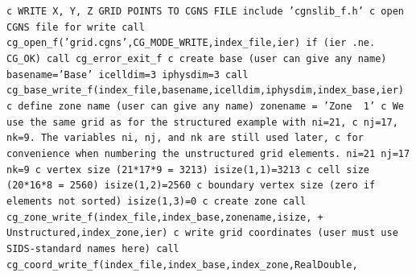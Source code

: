 \documentclass[12pt]{article}
\begin{document}
{\tt \noindent c  WRITE X, Y, Z GRID POINTS TO CGNS FILE
\newline\indent      include 'cgnslib\_f.h'
\newline c  open CGNS file for write
\newline\indent      call cg\_open\_f('grid.cgns',CG\_MODE\_WRITE,index\_file,ier)
\newline\indent      if (ier .ne. CG\_OK) call cg\_error\_exit\_f
\newline c  create base (user can give any name)
\newline\indent      basename='Base'
\newline\indent      icelldim=3
\newline\indent      iphysdim=3
\newline\indent      call cg\_base\_write\_f(index\_file,basename,icelldim,iphysdim,index\_base,ier)
\newline c  define zone name (user can give any name)
\newline\indent      zonename = 'Zone~~1'
\newline c  We use the same grid as for the structured example with ni=21,
\newline c  nj=17, nk=9.  The variables ni, nj, and nk are still used later,
\newline c  for convenience when numbering the unstructured grid elements.
\newline\indent      ni=21
\newline\indent      nj=17
\newline\indent      nk=9
\newline c  vertex size (21*17*9 = 3213)
\newline\indent      isize(1,1)=3213
\newline c  cell size (20*16*8 = 2560)
\newline\indent      isize(1,2)=2560
\newline c  boundary vertex size (zero if elements not sorted)
\newline\indent      isize(1,3)=0
\newline c  create zone
\newline\indent      call cg\_zone\_write\_f(index\_file,index\_base,zonename,isize,
\newline + \indent Unstructured,index\_zone,ier)
\newline c  write grid coordinates (user must use SIDS-standard names here)
\newline\indent      call cg\_coord\_write\_f(index\_file,index\_base,index\_zone,RealDouble,
}
\end{document}
